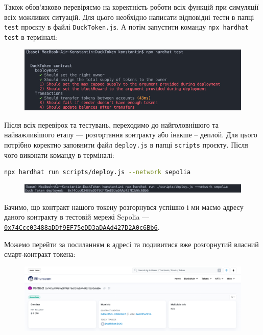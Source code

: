 Також обов'язково перевіряємо на коректність роботи всіх функцій при симуляції всіх можливих ситуацій. Для цього необхідно написати відповідні тести в папці \texttt{test} проєкту в файлі \texttt{DuckToken.js}. А потім запустити команду \texttt{npx hardhat test} в терміналі:

    \begin{figure}[ht]
        \centering
        \includegraphics[scale=0.6]{IMAGES/hardhat-test.png}
        \label{fig_vsc}
    \end{figure}

Після всіх перевірок та тестувань, переходимо до найголовнішого та найважливішого етапу --- розгортання контракту або інакше -- деплой. Для цього потрібно коректно заповнити файл \texttt{deploy.js} в папці \texttt{scripts} проєкту. Після чого виконати команду в терміналі:
\begin{lstlisting}[language=bash, basicstyle=\ttfamily]
npx hardhat run scripts/deploy.js --network sepolia
\end{lstlisting} 

    \begin{figure}[ht]
        \centering
        \includegraphics[scale=0.5]{IMAGES/hardhat-deploy.png}
        \label{fig_vsc}
    \end{figure}

Бачимо, що контракт нашого токену розгорнувся успішно і ми маємо адресу даного контракту в тестовій мережі Sepolia --- \href{https://sepolia.etherscan.io/address/0x74ccc03488addf9ef75edd3adaad427d2a0c6bb6}{\texttt{0x74Ccc03488aDDf9EF75eDD3aDAAd427D2A0c6Bb6}}.

Можемо перейти за посиланням в адресі та подивитися вже розгорнутий власний смарт-контракт токена:

    \begin{figure}[ht]
        \centering
        \includegraphics[scale=0.35]{IMAGES/etherscan-contract.png}
        \label{fig_vsc}
    \end{figure}

